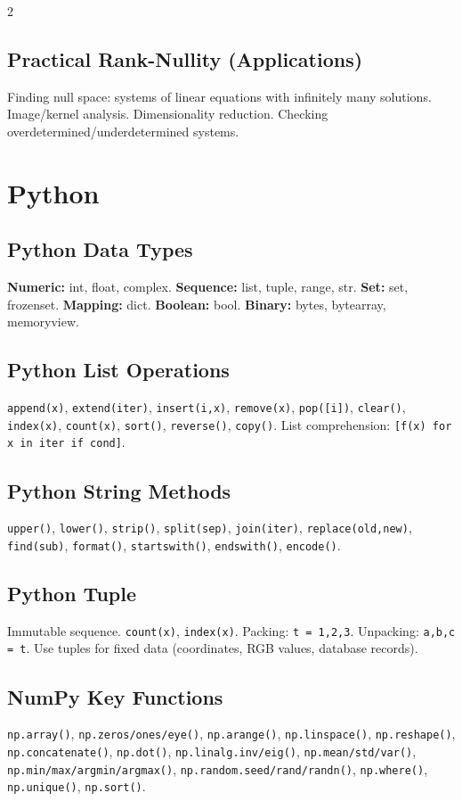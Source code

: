 \documentclass[10pt,a4paper]{article}
\begin{document}
\begin{multicols}{2}
\subsection{Practical Rank-Nullity (Applications)}
Finding null space: systems of linear equations with infinitely many solutions. Image/kernel analysis. Dimensionality reduction. Checking overdetermined/underdetermined systems.

\section{Python}

\subsection{Python Data Types}
\textbf{Numeric:} int, float, complex. \textbf{Sequence:} list, tuple, range, str. \textbf{Set:} set, frozenset. \textbf{Mapping:} dict. \textbf{Boolean:} bool. \textbf{Binary:} bytes, bytearray, memoryview.

\subsection{Python List Operations}
\texttt{append(x)}, \texttt{extend(iter)}, \texttt{insert(i,x)}, \texttt{remove(x)}, \texttt{pop([i])}, \texttt{clear()}, \texttt{index(x)}, \texttt{count(x)}, \texttt{sort()}, \texttt{reverse()}, \texttt{copy()}. List comprehension: \texttt{[f(x) for x in iter if cond]}.

\subsection{Python String Methods}
\texttt{upper()}, \texttt{lower()}, \texttt{strip()}, \texttt{split(sep)}, \texttt{join(iter)}, \texttt{replace(old,new)}, \texttt{find(sub)}, \texttt{format()}, \texttt{startswith()}, \texttt{endswith()}, \texttt{encode()}.

\subsection{Python Tuple}
Immutable sequence. \texttt{count(x)}, \texttt{index(x)}. Packing: \texttt{t = 1,2,3}. Unpacking: \texttt{a,b,c = t}. Use tuples for fixed data (coordinates, RGB values, database records).

\subsection{NumPy Key Functions}
\texttt{np.array()}, \texttt{np.zeros/ones/eye()}, \texttt{np.arange()}, \texttt{np.linspace()}, \texttt{np.reshape()}, \texttt{np.concatenate()}, \texttt{np.dot()}, \texttt{np.linalg.inv/eig()}, \texttt{np.mean/std/var()}, \texttt{np.min/max/argmin/argmax()}, \texttt{np.random.seed/rand/randn()}, \texttt{np.where()}, \texttt{np.unique()}, \texttt{np.sort()}.


\end{multicols}
\end{document}
